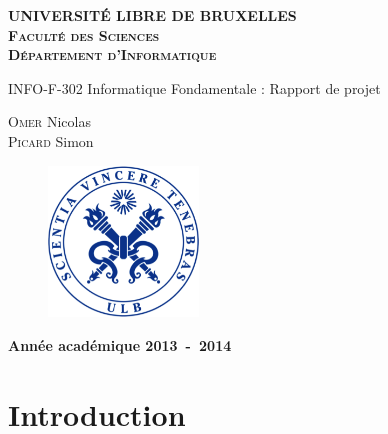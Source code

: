 \documentclass[11pt]{article}
\begin{document}
 \begin{titlepage}
 \begin{center}
 \textbf{\textsc{UNIVERSIT\'E LIBRE DE BRUXELLES}}\\
 \textbf{\textsc{Faculté des Sciences}}\\
 \textbf{\textsc{Département d'Informatique}}
 \vfill{}\vfill{}
 \begin{center}{\Huge INFO-F-302 Informatique Fondamentale : Rapport de projet}\end{center}{\Huge \par}
 \begin{center}{\large \textsc{Omer} Nicolas \\\textsc{Picard} Simon}\end{center}{\Huge \par}
 \vfill{}\vfill{}
 \vfill{}\vfill{}\enlargethispage{3cm}
 
 \begin{figure} [h!]
             \centering
     \includegraphics[width=4cm]{Sigle_ULB.png}
 \end{figure}
 
 \textbf{Année académique 2013~-~2014}
 \end{center}
 
 \end{titlepage}
 
\tableofcontents
\pagebreak

\section{Introduction}
\end{document}
